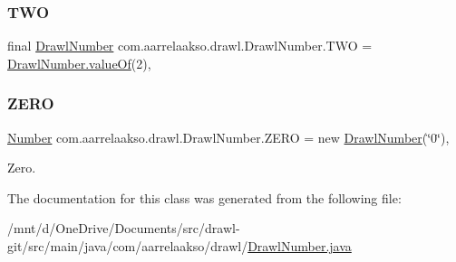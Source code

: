\subsubsection{\texorpdfstring{T\+WO}{TWO}}
{\footnotesize\ttfamily final \hyperlink{classcom_1_1aarrelaakso_1_1drawl_1_1_drawl_number}{Drawl\+Number} com.\+aarrelaakso.\+drawl.\+Drawl\+Number.\+T\+WO = \hyperlink{classcom_1_1aarrelaakso_1_1drawl_1_1_drawl_number_a368da87af7b1b38bd5185715afadcad6}{Drawl\+Number.\+value\+Of}(2)\hspace{0.3cm}{\ttfamily [static]}, {\ttfamily [protected]}}

\mbox{\label{classcom_1_1aarrelaakso_1_1drawl_1_1_drawl_number_ae79e88954ed30a7f939cc62836fdc75c}} 
\subsubsection{\texorpdfstring{Z\+E\+RO}{ZERO}}
{\footnotesize\ttfamily \hyperlink{interfacecom_1_1aarrelaakso_1_1drawl_1_1_number}{Number} com.\+aarrelaakso.\+drawl.\+Drawl\+Number.\+Z\+E\+RO = new \hyperlink{classcom_1_1aarrelaakso_1_1drawl_1_1_drawl_number}{Drawl\+Number}(\char`\"{}0\char`\"{})\hspace{0.3cm}{\ttfamily [static]}, {\ttfamily [protected]}}



Zero. 



The documentation for this class was generated from the following file\+:\begin{DoxyCompactItemize}
\item 
/mnt/d/\+One\+Drive/\+Documents/src/drawl-\/git/src/main/java/com/aarrelaakso/drawl/\hyperlink{_drawl_number_8java}{Drawl\+Number.\+java}\end{DoxyCompactItemize}

